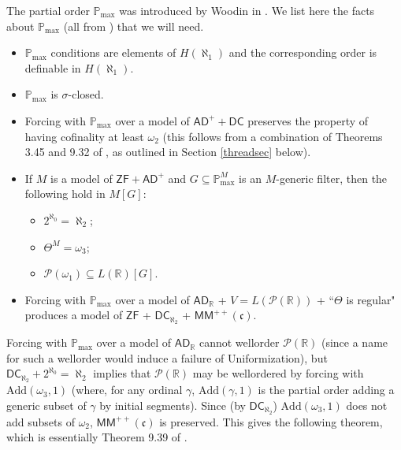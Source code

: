 \documentclass[12pt]{article}
\newcommand{\AD}{\mathsf{AD}}
\newcommand{\ADR}{\mathsf{AD}_{\mathbb{R}}}
\newcommand{\Add}{\mathrm{Add}}
\newcommand{\pmax}{\mathbb{P}_{\mathrm{max}}}
\newcommand{\bbR}{\mathbb{R}}
\newcommand{\DC}{\mathsf{DC}}
\newcommand{\cP}{\mathcal{P}}
\newcommand{\MM}{\mathsf{MM}}
\newcommand{\ZF}{\mathsf{ZF}}
\begin{document}
The partial order $\pmax$ was introduced by Woodin in \cite{Woodin}. We list here the facts about $\pmax$ (all from \cite{Woodin}) that we will need.
\begin{itemize}
\item $\pmax$ conditions are elements of $H(\aleph_{1})$ and the corresponding order is definable in $H(\aleph_{1})$.

\item $\pmax$ is $\sigma$-closed.

\item  Forcing with $\pmax$ over a model of $\AD^{+} + \DC$ preserves the property of having cofinality at least $\omega_{2}$ (this follows from a combination of Theorems 3.45 and 9.32 of \cite{Woodin}, as outlined in Section \ref{threadsec} below).

\item If $M$ is a model of $\ZF + \AD^{+}$ and $G\subseteq \pmax^{M}$ is an $M$-generic filter, then the following hold in $M[G]$:
\begin{itemize}
\item $2^{\aleph_{0}} = \aleph_{2}$; \item $\Theta^{M} = \omega_{3}$; \item $\cP(\omega_{1}) \subseteq L(\bbR)[G]$.
\end{itemize}




\item Forcing with $\pmax$ over a model of $\ADR$ +  $V = L(\cP(\bbR))$ + ``$\Theta$ is regular" produces a model of $\ZF$ + $\DC_{\aleph_{2}}$ +  $\MM^{++}(\mathfrak{c})$.
\end{itemize}

Forcing with $\pmax$ over a model of $\ADR$ cannot wellorder $\cP(\bbR)$ (since a name for such a wellorder would induce a failure of Uniformization), but $\DC_{\aleph_{2}} + 2^{\aleph_{0}} = \aleph_{2}$ implies that $\cP(\bbR)$ may be wellordered  by forcing with $\Add(\omega_{3}, 1)$ (where, for any ordinal $\gamma$, $\Add(\gamma, 1)$ is the partial order adding a generic subset of $\gamma$ by initial segments). Since (by $\DC_{\aleph_{2}}$) $\Add(\omega_{3}, 1)$ does not add subsets of $\omega_{2}$, $\MM^{++}(\mathfrak{c})$ is preserved. This gives the following theorem, which is essentially Theorem 9.39 of \cite{Woodin}.
\end{document}
